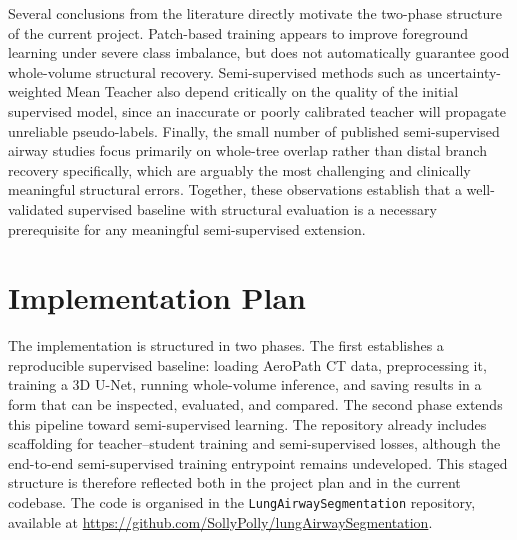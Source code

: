 \documentclass[11pt,a4paper]{article}
\begin{document}
Several conclusions from the literature directly motivate the two-phase structure of the current project. Patch-based training appears to improve foreground learning under severe class imbalance, but does not automatically guarantee good whole-volume structural recovery. Semi-supervised methods such as uncertainty-weighted Mean Teacher also depend critically on the quality of the initial supervised model, since an inaccurate or poorly calibrated teacher will propagate unreliable pseudo-labels. Finally, the small number of published semi-supervised airway studies focus primarily on whole-tree overlap rather than distal branch recovery specifically, which are arguably the most challenging and clinically meaningful structural errors. Together, these observations establish that a well-validated supervised baseline with structural evaluation is a necessary prerequisite for any meaningful semi-supervised extension.

\section{Implementation Plan}

The implementation is structured in two phases. The first establishes a reproducible supervised baseline: loading AeroPath CT data, preprocessing it, training a 3D U-Net, running whole-volume inference, and saving results in a form that can be inspected, evaluated, and compared. The second phase extends this pipeline toward semi-supervised learning. The repository already includes scaffolding for teacher--student training and semi-supervised losses, although the end-to-end semi-supervised training entrypoint remains undeveloped. This staged structure is therefore reflected both in the project plan and in the current codebase. The code is organised in the \texttt{LungAirwaySegmentation} repository, available at \url{https://github.com/SollyPolly/lungAirwaySegmentation}.
\end{document}
